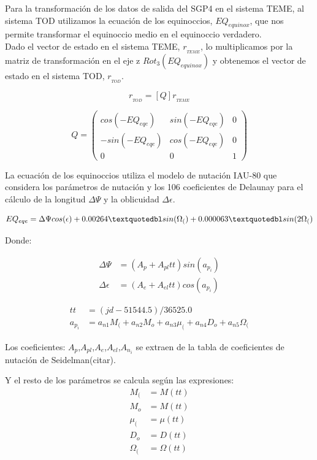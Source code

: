 Para la transformaci\'on de los datos de salida del SGP4 en el sistema TEME, al sistema TOD utilizamos la ecuaci\'on de los equinoccios, $EQ_{equinox}$, que nos permite transformar el equinoccio medio en el equinoccio verdadero.\\
Dado el vector de estado en el sistema TEME, $r_{_{TEME}}$, lo multiplicamos por la matriz de transformaci\'on en el eje z $Rot_{3}(EQ_{equinox})$ y obtenemos el vector de estado en el sistema TOD, $r_{_{TOD}}$.

\begin{equation}
 r_{_{TOD}} = [Q] r_{_{TEME}}
\end{equation}


 \[ Q =
\left( \begin{array}{ccc}
 cos(-EQ_{eqe}) & sin(-EQ_{eqe}) &  0 \\ 
 -sin(-EQ_{eqe}) & cos(-EQ_{eqe}) &  0 \\
 0 & 0 & 1
\end{array} \right) \] 


La ecuaci\'on de los equinoccios utiliza el modelo de nutaci\'on IAU-80 que considera los par\'ametros de nutaci\'on y los 106 coeficientes de Delaunay para el c\'alculo de la longitud $\Delta \Psi$ y la oblicuidad $\Delta \epsilon$.

\begin{equation}
 EQ_{eqe}=\Delta \Psi cos({\epsilon}) + 0.00264 \textquotedbl sin(\Omega_{(}) + 0.000063 \textquotedbl sin (2 \Omega_{(})
\end{equation}

Donde:

\begin{align*}
 \Delta \Psi &= (A_{p} + A_{pl} tt) sin(a_{p_{i}})\\
 \Delta \epsilon &= (A_{e} + A_{el} tt) cos(a_{p_{i}})
\end{align*}

\begin{align*}
 tt &= (jd - 51544.5)/36525.0\\
 a_{p_{i}} &= a_{n1}M_{(}+a_{n2}M_{o}+a_{n3}\mu_{(}+a_{n4}D_{o}+a_{n5}\Omega_{(}
\end{align*}

Los coeficientes: $A_{p}$,$A_{pl}$,$A_{e}$,$A_{el}$,$A_{n_{i}}$ se extraen de la tabla de coeficientes de nutaci\'on de Seidelman(citar).

Y el resto de los par\'ametros se calcula seg\'un las expresiones:\\

\begin{align*}
 M_{(} & = M(tt)\\
 M_{o} & = M(tt)\\
 \mu_{(} &= \mu(tt)\\
 D_{o} &= D(tt)\\
 \Omega_{(} &= \Omega(tt)
\end{align*}










